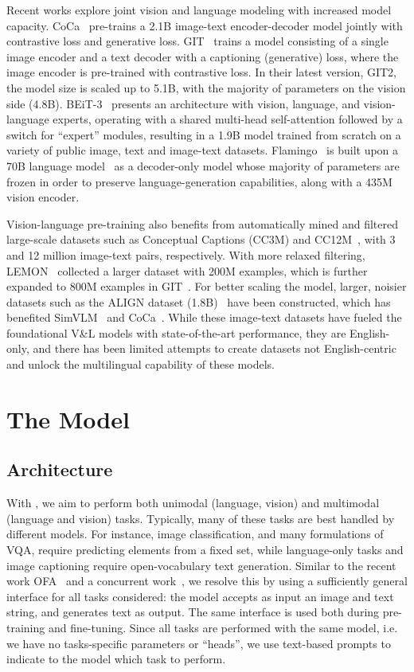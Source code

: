 \documentclass{article}
\begin{document}
Recent works explore joint vision and language modeling with increased model capacity.
CoCa~\citep{coca} pre-trains a 2.1B image-text encoder-decoder model jointly with contrastive loss and generative loss.
GIT~\citep{git} trains a model consisting of a single image encoder and a text decoder with a captioning (generative) loss, where the image encoder is pre-trained with contrastive loss. In their latest version, GIT2, the model size is scaled up to 5.1B, with the majority of parameters on the vision side (4.8B).
BEiT-3~\citep{beit3} presents an architecture with vision, language, and vision-language experts, operating with a shared multi-head self-attention followed by a switch for ``expert'' modules, resulting in a 1.9B model trained from scratch on a variety of public image, text and image-text datasets.
Flamingo~\citep{flamingo} is built upon a 70B language model~\citep{hoffmann2022chinchilla} as a decoder-only model whose majority of parameters are frozen in order to preserve language-generation capabilities, along with a 435M vision encoder.

Vision-language pre-training also benefits from automatically mined and filtered large-scale datasets such as Conceptual Captions (CC3M) and CC12M~\citep{cc3m,cc12m}, with 3 and 12 million image-text pairs, respectively.
With more relaxed filtering, LEMON~\citep{lemon} collected a larger dataset with 200M examples, which is further expanded to 800M examples in GIT~\citep{git}.
For better scaling the model, larger, noisier datasets such as the ALIGN dataset (1.8B)~\citep{align} have been constructed, which has benefited SimVLM~\citep{simvlm} and CoCa~\citep{coca}. While these image-text datasets have fueled the foundational V\&L models with state-of-the-art performance, they are English-only, and there has been limited attempts to create datasets not English-centric and unlock the multilingual capability of these models.
\section{The \NAME Model}
\label{sec:model}

\subsection{Architecture}
\label{sec:arch}
With \NAME, we aim to perform both unimodal (language, vision) and multimodal (language and vision) tasks.
Typically, many of these tasks are best handled by different models.
For instance, image classification, and many formulations of VQA, require predicting elements from a fixed set,
while language-only tasks and image captioning require open-vocabulary text generation.
Similar to the recent work OFA~\citep{wang2022ofa} and a concurrent work~\citep{lu2022unified}, we resolve this by using  a sufficiently general interface for all tasks considered: the model accepts as input an image and text string, and generates text as output.
The same interface is used both during pre-training and fine-tuning.
Since all tasks are performed with the same model, i.e. we have no tasks-specific parameters or ``heads'', we use text-based prompts to indicate to the model which task to perform.
\end{document}
